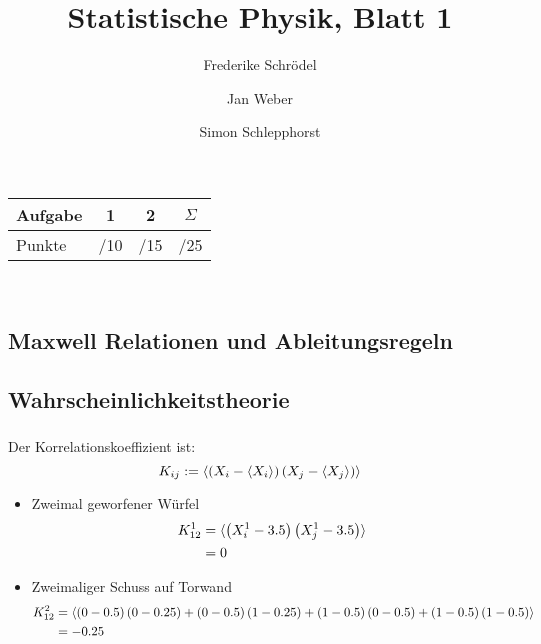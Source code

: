 \documentclass[11pt, ngerman, fleqn, DIV=15, headinclude]{scrartcl}
\title{Statistische Physik, Blatt 1}
\author{
    Frederike Schrödel \and Jan Weber \and Simon Schlepphorst
}
\begin{document}
\maketitle
\begin{center}
	\begin{tabular}{l|c|c|c}
		Aufgabe &1&2&$\Sigma$\\
		\hline
		Punkte &\quad /10 & \quad /15 & \quad /25 
	\end{tabular}\\
\end{center}


\setcounter{section}{1}

\subsection{Maxwell Relationen und Ableitungsregeln}


\subsection{Wahrscheinlichkeitstheorie}

\subsubsection{ }

\subsubsection{ }

\subsubsection{ }

\subsubsection{ }

\subsubsection{ }

Der Korrelationskoeffizient ist:
\begin{equation}
	K_{ij} := \langle \left( X_i - \langle X_i \rangle \right) \left( X_j - \langle
	X_j \rangle \right) \rangle
\end{equation}

\begin{itemize}
	\item  Zweimal geworfener Würfel
		\begin{align*}
			K^1_{12} &= \langle \left( X^1_i - 3.5 \right) \left( X^1_j - 3.5 \right)
			\rangle \\
			&= 0
		\end{align*}
	\item  Zweimaliger Schuss auf Torwand
		\begin{align*}
			K^2_{12} &= \langle \left( 0 - 0.5 \right)\left( 0 - 0.25 \right) +
			\left( 0 - 0.5 \right)\left( 1 - 0.25 \right) + \left( 1 -0.5 \right)\left( 0-0.5 \right) +
			\left( 1 -0.5 \right)\left( 1 -0.5 \right)\rangle\\
			&= -0.25
		\end{align*}
\end{itemize}
\end{document}
